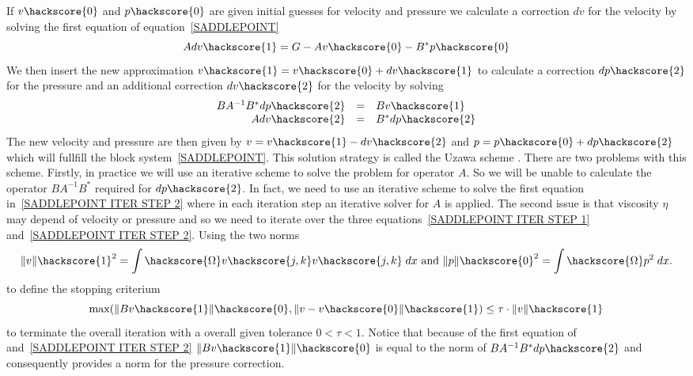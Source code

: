 If $v\hackscore{0}$ and $p\hackscore{0}$ are given initial guesses for
velocity and pressure we calculate a correction $dv$ for the velocity by solving the first
equation of equation~\ref{SADDLEPOINT}
 \begin{equation}\label{SADDLEPOINT ITER STEP 1}
 A dv\hackscore{1} = G - A v\hackscore{0} - B^{*} p\hackscore{0}
\end{equation}
We then insert the new approximation $v\hackscore{1}=v\hackscore{0}+dv\hackscore{1}$ to calculate a correction $dp\hackscore{2}$
for the pressure and an additional correction $dv\hackscore{2}$ for the velocity by solving
 \begin{equation}
 \begin{array}{rcl}
 B A^{-1} B^{*} dp\hackscore{2} & = & Bv\hackscore{1} \\
 A dv\hackscore{2} & = & B^{*} dp\hackscore{2} 
\end{array}
 \label{SADDLEPOINT ITER STEP 2}
 \end{equation}
The new velocity and pressure are then given by $v=v\hackscore{1}-dv\hackscore{2}$ and
$p=p\hackscore{0}+dp\hackscore{2}$ which will fullfill the block system~\ref{SADDLEPOINT}. 
This solution strategy is called the Uzawa scheme . There are 
two problems with this scheme. Firstly, in practice we will use an iterative scheme
to solve the problem for operator $A$. So we will be unable to calculate the operator
$ B A^{-1} B^{*}$ required for $dp\hackscore{2}$. In fact, we need to use an iterative scheme
to solve the first equation in~\ref{SADDLEPOINT ITER STEP 2} where in each iteration step
an iterative solver for $A$ is applied. The second issue is that 
viscosity $\eta$ may depend of velocity or pressure and so we need to iterate over the 
three equations~\ref{SADDLEPOINT ITER STEP 1} and~\ref{SADDLEPOINT ITER STEP 2}. Using the
two norms
\begin{equation}
\|v\|\hackscore{1}^2 = \int\hackscore{\Omega} v\hackscore{j,k}v\hackscore{j,k} \; dx 
\mbox{ and }
\|p\|\hackscore{0}^2= \int\hackscore{\Omega} p^2 \; dx.
\label{STOKES STOP}
\end{equation}
to define the stopping criterium
 \begin{equation}
\max(\|Bv\hackscore{1}\|\hackscore{0},\|v-v\hackscore{0}\|\hackscore{1}) \le \tau \cdot \|v\|\hackscore{1} 
 \end{equation}
to terminate the overall iteration with a overall given tolerance $0<\tau<1$. 
Notice that because of the first equation of
and~\ref{SADDLEPOINT ITER STEP 2} $\|Bv\hackscore{1}\|\hackscore{0}$ is equal to the
norm of $B A^{-1} B^{*} dp\hackscore{2}$ and consequently provides a norm for the  pressure correction.

